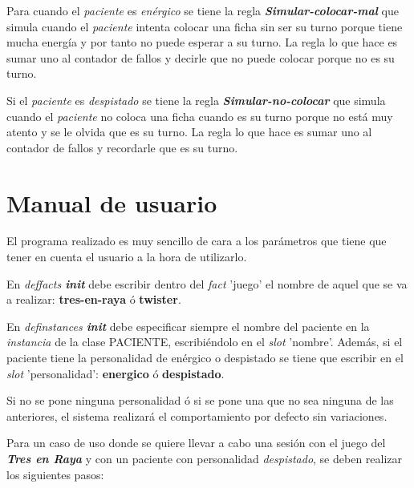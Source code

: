 \documentclass{uc3mpracticas}
\begin{document}
  Para cuando el \textit{paciente} es \textit{enérgico} se tiene la regla \textbf{\textit{Simular-colocar-mal}} que simula cuando el \textit{paciente} intenta colocar una ficha sin ser su turno porque tiene mucha energía y por tanto no puede esperar a su turno. La regla lo que hace es sumar uno al contador de fallos y decirle que no puede colocar porque no es su turno.

  \vspace{3mm}

  Si el \textit{paciente} es \textit{despistado} se tiene la regla \textbf{\textit{Simular-no-colocar}} que simula cuando el \textit{paciente} no coloca una ficha cuando es su turno porque no está muy atento y se le olvida que es su turno. La regla lo que hace es sumar uno al contador de fallos y recordarle que es su turno.

  \newpage

  \section{Manual de usuario}

  El programa realizado es muy sencillo de cara a los parámetros que tiene que tener en cuenta el usuario a la hora de utilizarlo.

  \vspace{2mm}

  En \textit{deffacts \textbf{init}} debe escribir dentro del \textit{fact} 'juego' el nombre de aquel que se va a realizar: \textbf{tres-en-raya} ó \textbf{twister}.

  \vspace{2mm}

  En \textit{definstances \textbf{init}} debe especificar siempre el nombre del paciente en la \textit{instancia} de la clase PACIENTE, escribiéndolo en el \textit{slot} 'nombre'. Además, si el paciente tiene la personalidad de enérgico o despistado se tiene que escribir en el \textit{slot} 'personalidad': \textbf{energico} ó \textbf{despistado}.

  \vspace{1mm}

  Si no se pone ninguna personalidad ó si se pone una que no sea ninguna de las anteriores, el sistema realizará el comportamiento por defecto sin variaciones.

  \vspace{3mm}

  Para un caso de uso donde se quiere llevar a cabo una sesión con el juego del \textit{\textbf{Tres en Raya}} y con un paciente con personalidad \textit{despistado}, se deben realizar los siguientes pasos:
\end{document}
